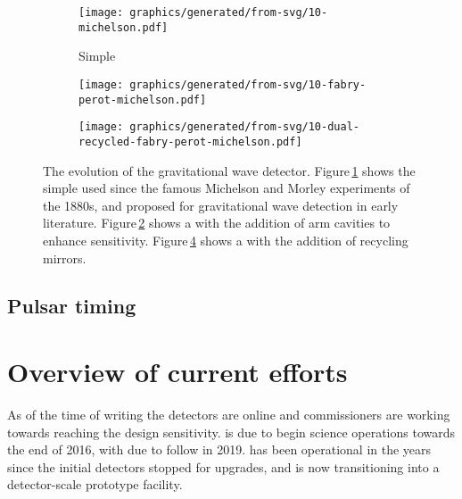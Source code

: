 \begin{figure}
  \begin{center}
    \begin{subfigure}{.3\textwidth}
      \texttt{[image: graphics/generated/from-svg/10-michelson.pdf]}
      \caption{Simple \MI{}}
      \label{fig:mi}
    \end{subfigure}
    \hfill
    \begin{subfigure}{.3\textwidth}
      \texttt{[image: graphics/generated/from-svg/10-fabry-perot-michelson.pdf]}
      \caption{\FPMI{}}
      \label{fig:fpmi}
    \end{subfigure}
    \hfill
    \begin{subfigure}{.3\textwidth}
      \texttt{[image: graphics/generated/from-svg/10-dual-recycled-fabry-perot-michelson.pdf]}
      \caption{\DRFPMI{}}
      \label{fig:drfpmi}
    \end{subfigure}
    \caption[The evolution of the gravitational wave detector]{The evolution of the gravitational wave detector. Figure\,\ref{fig:mi} shows the simple \MI{} used since the famous Michelson and Morley experiments of the 1880s, and proposed for gravitational wave detection in early literature. Figure\,\ref{fig:fpmi} shows a \MI{} with the addition of \FP{} arm cavities to enhance sensitivity. Figure\,\ref{fig:drfpmi} shows a \FPMI{} with the addition of recycling mirrors.}
  \end{center}
\end{figure}


\subsection{Pulsar timing}

\section{Overview of current efforts}
As of the time of writing the \ALIGO{} detectors are online and commissioners are working towards reaching the design sensitivity. \AVIRGO{} is due to begin science operations towards the end of 2016, with \KAGRA{} due to follow in 2019. \GEOHF{} has been operational in the years since the initial detectors stopped for upgrades, and is now transitioning into a detector-scale prototype facility.

